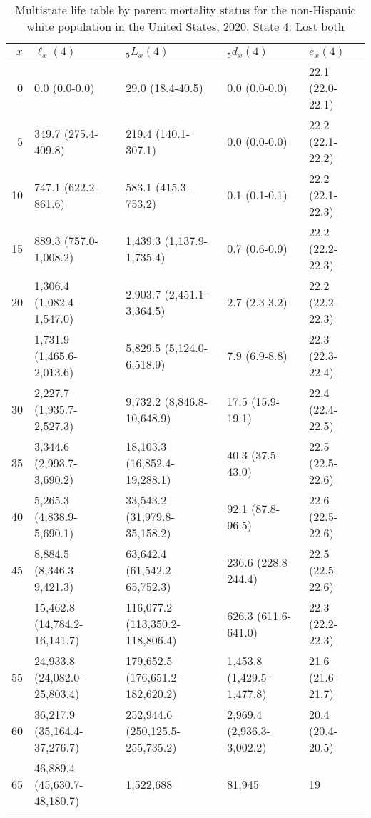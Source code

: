 \begin{table}

\caption{Multistate life table by parent mortality status for the non-Hispanic white population in the United States, 2020. State 4: Lost both}
\centering
\begin{tabular}[t]{rllll}
\toprule
$x$ & $\ell_x(4)$ & ${}_5 L_x(4)$ & ${}_5 d_x(4)$ & $e_x(4)$\\
\midrule
0 & 0.0 (0.0-0.0) & 29.0 (18.4-40.5) & 0.0 (0.0-0.0) & 22.1 (22.0-22.1)\\
5 & 349.7 (275.4-409.8) & 219.4 (140.1-307.1) & 0.0 (0.0-0.0) & 22.2 (22.1-22.2)\\
10 & 747.1 (622.2-861.6) & 583.1 (415.3-753.2) & 0.1 (0.1-0.1) & 22.2 (22.1-22.3)\\
15 & 889.3 (757.0-1,008.2) & 1,439.3 (1,137.9-1,735.4) & 0.7 (0.6-0.9) & 22.2 (22.2-22.3)\\
20 & 1,306.4 (1,082.4-1,547.0) & 2,903.7 (2,451.1-3,364.5) & 2.7 (2.3-3.2) & 22.2 (22.2-22.3)\\
\addlinespace
25 & 1,731.9 (1,465.6-2,013.6) & 5,829.5 (5,124.0-6,518.9) & 7.9 (6.9-8.8) & 22.3 (22.3-22.4)\\
30 & 2,227.7 (1,935.7-2,527.3) & 9,732.2 (8,846.8-10,648.9) & 17.5 (15.9-19.1) & 22.4 (22.4-22.5)\\
35 & 3,344.6 (2,993.7-3,690.2) & 18,103.3 (16,852.4-19,288.1) & 40.3 (37.5-43.0) & 22.5 (22.5-22.6)\\
40 & 5,265.3 (4,838.9-5,690.1) & 33,543.2 (31,979.8-35,158.2) & 92.1 (87.8-96.5) & 22.6 (22.5-22.6)\\
45 & 8,884.5 (8,346.3-9,421.3) & 63,642.4 (61,542.2-65,752.3) & 236.6 (228.8-244.4) & 22.5 (22.5-22.6)\\
\addlinespace
50 & 15,462.8 (14,784.2-16,141.7) & 116,077.2 (113,350.2-118,806.4) & 626.3 (611.6-641.0) & 22.3 (22.2-22.3)\\
55 & 24,933.8 (24,082.0-25,803.4) & 179,652.5 (176,651.2-182,620.2) & 1,453.8 (1,429.5-1,477.8) & 21.6 (21.6-21.7)\\
60 & 36,217.9 (35,164.4-37,276.7) & 252,944.6 (250,125.5-255,735.2) & 2,969.4 (2,936.3-3,002.2) & 20.4 (20.4-20.5)\\
65 & 46,889.4 (45,630.7-48,180.7) & 1,522,688 & 81,945 & 19\\
\bottomrule
\end{tabular}
\end{table}